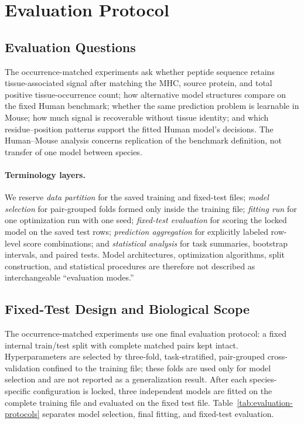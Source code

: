 \section{Evaluation Protocol}

\subsection{Evaluation Questions}

The occurrence-matched experiments ask whether peptide sequence retains tissue-associated signal after matching the MHC, source protein, and total positive tissue-occurrence count; how alternative model structures compare on the fixed Human benchmark; whether the same prediction problem is learnable in Mouse; how much signal is recoverable without tissue identity; and which residue--position patterns support the fitted Human model's decisions. The Human--Mouse analysis concerns replication of the benchmark definition, not transfer of one model between species.

\paragraph{Terminology layers.}
We reserve \emph{data partition} for the saved training and fixed-test files; \emph{model selection} for pair-grouped folds formed only inside the training file; \emph{fitting run} for one optimization run with one seed; \emph{fixed-test evaluation} for scoring the locked model on the saved test rows; \emph{prediction aggregation} for explicitly labeled row-level score combinations; and \emph{statistical analysis} for task summaries, bootstrap intervals, and paired tests. Model architectures, optimization algorithms, split construction, and statistical procedures are therefore not described as interchangeable “evaluation modes.”

\subsection{Fixed-Test Design and Biological Scope}

The occurrence-matched experiments use one final evaluation protocol: a fixed internal train/test split with complete matched pairs kept intact. Hyperparameters are selected by three-fold, task-stratified, pair-grouped cross-validation confined to the training file; these folds are used only for model selection and are not reported as a generalization result. After each species-specific configuration is locked, three independent models are fitted on the complete training file and evaluated on the fixed test file. Table~\ref{tab:evaluation-protocols} separates model selection, final fitting, and fixed-test evaluation.

